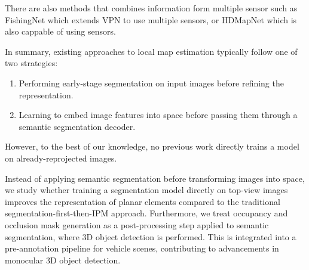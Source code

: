 There are also methods that combines information form multiple sensor such as FishingNet \cite{fishingnet} which extends VPN to use multiple sensors, or HDMapNet which is also cappable of using  sensors.  


In summary, existing approaches to local  map estimation typically follow one of two strategies: 
\begin{enumerate}
    \item Performing early-stage segmentation on input images before refining the  representation.
    \item Learning to embed image features into  space before passing them through a semantic segmentation decoder.
\end{enumerate}
However, to the best of our knowledge, no previous work directly trains a model on already-reprojected  images.

Instead of applying semantic segmentation before transforming images into  space, we study whether training a segmentation model directly on top-view images improves the representation of planar elements compared to the traditional segmentation-first-then-IPM approach. Furthermore, we treat occupancy and occlusion mask generation as a post-processing step applied to  semantic segmentation, where 3D object detection is performed. This is integrated into a pre-annotation pipeline for vehicle scenes, contributing to advancements in monocular 3D object detection. 

